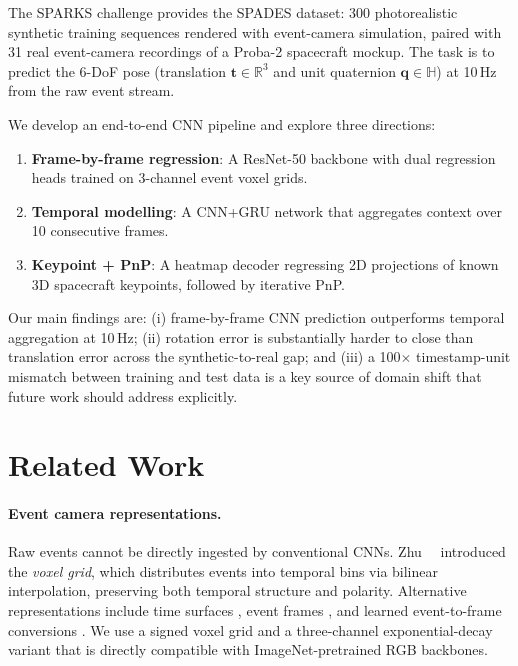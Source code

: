 \documentclass[10pt,twocolumn,letterpaper]{article}
\begin{document}
The SPARKS challenge \cite{sparks2026} provides the SPADES dataset:
300 photorealistic synthetic training sequences rendered with event-camera
simulation, paired with 31 real event-camera recordings of a Proba-2
spacecraft mockup.  The task is to predict the 6-DoF pose (translation
$\mathbf{t}\in\mathbb{R}^{3}$ and unit quaternion
$\mathbf{q}\in\mathbb{H}$) at 10\,Hz from the raw event stream.

We develop an end-to-end CNN pipeline and explore three directions:
\begin{enumerate}
  \item \textbf{Frame-by-frame regression}: A ResNet-50 backbone with
        dual regression heads trained on 3-channel event voxel grids.
  \item \textbf{Temporal modelling}: A CNN+GRU network that aggregates
        context over 10 consecutive frames.
  \item \textbf{Keypoint + PnP}: A heatmap decoder regressing 2D
        projections of known 3D spacecraft keypoints, followed by
        iterative PnP.
\end{enumerate}
Our main findings are: (i) frame-by-frame CNN prediction outperforms
temporal aggregation at 10\,Hz; (ii) rotation error is substantially
harder to close than translation error across the synthetic-to-real gap;
and (iii) a 100$\times$ timestamp-unit mismatch between training and test
data is a key source of domain shift that future work should address explicitly.

\section{Related Work}
\label{sec:related}

\paragraph{Event camera representations.}
Raw events cannot be directly ingested by conventional CNNs.
Zhu~\etal~\cite{zhu2019unsupervised} introduced the \emph{voxel grid},
which distributes events into temporal bins via bilinear interpolation,
preserving both temporal structure and polarity.  Alternative
representations include time surfaces \cite{lagorce2017hots},
event frames \cite{rebecq2017real}, and learned event-to-frame
conversions \cite{rebecq2019events}.  We use a signed voxel grid and
a three-channel exponential-decay variant that is directly
compatible with ImageNet-pretrained RGB backbones.
\end{document}
